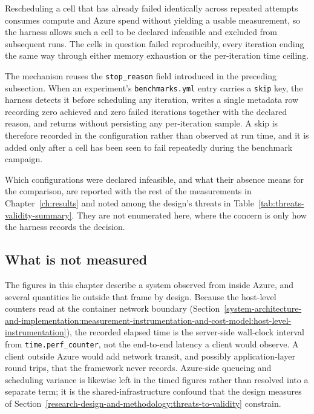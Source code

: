 Rescheduling a cell that has already failed identically across repeated attempts consumes compute and Azure spend without yielding a usable measurement, so the harness allows such a cell to be declared infeasible and excluded from subsequent runs. The cells in question failed reproducibly, every iteration ending the same way through either memory exhaustion or the per-iteration time ceiling.

The mechanism reuses the \texttt{stop\_reason} field introduced in the preceding subsection. When an experiment's \texttt{benchmarks.yml} entry carries a \texttt{skip} key, the harness detects it before scheduling any iteration, writes a single metadata row recording zero achieved and zero failed iterations together with the declared reason, and returns without persisting any per-iteration sample. A skip is therefore recorded in the configuration rather than observed at run time, and it is added only after a cell has been seen to fail repeatedly during the benchmark campaign.

Which configurations were declared infeasible, and what their absence means for the comparison, are reported with the rest of the measurements in Chapter~\ref{ch:results} and noted among the design's threats in Table~\ref{tab:threats-validity-summary}. They are not enumerated here, where the concern is only how the harness records the decision.

\subsection{What is not measured}
\label{system-architecture-and-implementation:measurement-instrumentation-and-cost-model:what-is-not-measured}

The figures in this chapter describe a system observed from inside Azure, and several quantities lie outside that frame by design. Because the host-level counters read at the container network boundary (Section~\ref{system-architecture-and-implementation:measurement-instrumentation-and-cost-model:host-level-instrumentation}), the recorded elapsed time is the server-side wall-clock interval from \texttt{time.perf\_counter}, not the end-to-end latency a client would observe. A client outside Azure would add network transit, and possibly application-layer round trips, that the framework never records. Azure-side queueing and scheduling variance is likewise left in the timed figures rather than resolved into a separate term; it is the shared-infrastructure confound that the design measures of Section~\ref{research-design-and-methodology:threats-to-validity} constrain.

